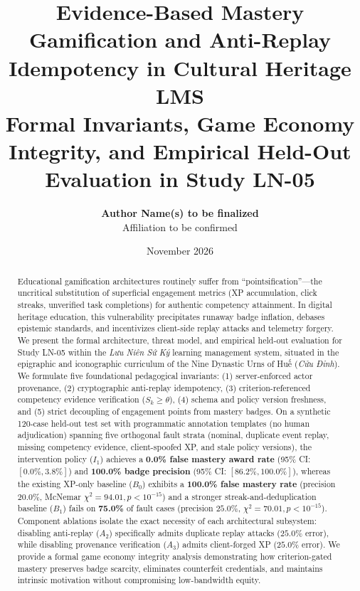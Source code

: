 \documentclass[11pt,a4paper]{article}
\title{\textbf{Evidence-Based Mastery Gamification and Anti-Replay Idempotency in Cultural Heritage LMS}\\[0.5em]
\large Formal Invariants, Game Economy Integrity, and Empirical Held-Out Evaluation in Study LN-05}
\author{\textbf{Author Name(s) to be finalized}\\
\small Affiliation to be confirmed}
\date{November 2026}
\begin{document}
\maketitle

\begin{abstract}
Educational gamification architectures routinely suffer from ``pointsification''—the uncritical substitution of superficial engagement metrics (XP accumulation, click streaks, unverified task completions) for authentic competency attainment. In digital heritage education, this vulnerability precipitates runaway badge inflation, debases epistemic standards, and incentivizes client-side replay attacks and telemetry forgery. We present the formal architecture, threat model, and empirical held-out evaluation for Study LN-05 within the \textit{Lưu Niên Sứ Ký} learning management system, situated in the epigraphic and iconographic curriculum of the Nine Dynastic Urns of Huế (\textit{Cửu Đỉnh}). We formulate five foundational pedagogical invariants: (1) server-enforced actor provenance, (2) cryptographic anti-replay idempotency, (3) criterion-referenced competency evidence verification ($S_k \ge \theta$), (4) schema and policy version freshness, and (5) strict decoupling of engagement points from mastery badges. On a synthetic 120-case held-out test set with programmatic annotation templates (no human adjudication) spanning five orthogonal fault strata (nominal, duplicate event replay, missing competency evidence, client-spoofed XP, and stale policy versions), the intervention policy ($I_1$) achieves a \textbf{0.0\% false mastery award rate} (95\% CI: $[0.0\%, 3.8\%]$) and \textbf{100.0\% badge precision} (95\% CI: $[86.2\%, 100.0\%]$), whereas the existing XP-only baseline ($B_0$) exhibits a \textbf{100.0\% false mastery rate} (precision $20.0\%$, McNemar $\chi^2 = 94.01, p < 10^{-15}$) and a stronger streak-and-deduplication baseline ($B_1$) fails on \textbf{75.0\%} of fault cases (precision $25.0\%$, $\chi^2 = 70.01, p < 10^{-15}$). Component ablations isolate the exact necessity of each architectural subsystem: disabling anti-replay ($A_2$) specifically admits duplicate replay attacks ($25.0\%$ error), while disabling provenance verification ($A_3$) admits client-forged XP ($25.0\%$ error). We provide a formal game economy integrity analysis demonstrating how criterion-gated mastery preserves badge scarcity, eliminates counterfeit credentials, and maintains intrinsic motivation without compromising low-bandwidth equity.
\end{abstract}
\end{document}
